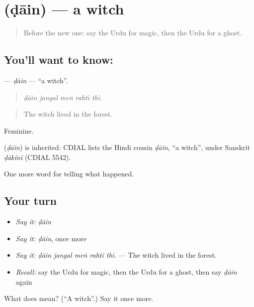 \section[\texorpdfstring{\ur{ڈائن} (ḍāin)}{ڈائن (ḍāin)}]{ (ḍāin) — a witch}

\label{lesson:UR-C325-dain}



\begin{quote}
Before the new one: say the Urdu for magic, then the Urdu for a ghost.
\end{quote}

\subsection*{You'll want to know: }
\textbf{} — \emph{ḍāin} — \textquotedblleft{}a witch\textquotedblright{}.

\begin{quote}
    
\end{quote}

\begin{quote}
\emph{ḍāin jangal meṅ rahtī thī.}
\end{quote}

\begin{quote}
The witch lived in the forest.
\end{quote}

Feminine.

\begin{cousinweb}
\textbf{} (\emph{ḍāin}) is inherited: CDIAL lists the Hindi cousin \emph{ḍāin}, \textquotedblleft{}a witch\textquotedblright{}, under Sanskrit \emph{ḍākínī} (CDIAL 5542).
\end{cousinweb}

\begin{grammarlens}[title={What you've built}]
One more word for telling what happened.
\end{grammarlens}

\subsection*{Your turn}
\begin{itemize}
\raggedright
  \item \emph{Say it:} \emph{ḍāin}
  \item \emph{Say it:} \emph{ḍāin}, once more
  \item \emph{Say it:} \emph{ḍāin jangal meṅ rahtī thī.} — The witch lived in the forest.
  \item \emph{Recall:} say the Urdu for magic, then the Urdu for a ghost, then say \emph{ḍāin} again
\end{itemize}

\begin{tcolorbox}[breakable,colback=teal!4,colframe=teal!35!black,title={Before you move on}]
What does  mean? (\textquotedblleft{}A witch\textquotedblright{}.) Say it once more.
\end{tcolorbox}
